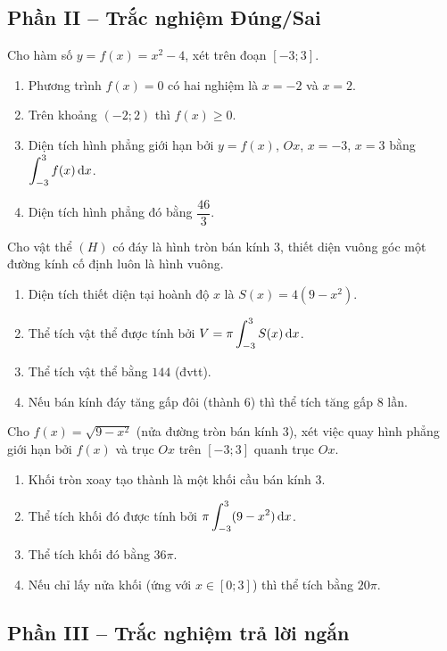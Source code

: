 \newpage
\subsection{Phần II -- Trắc nghiệm Đúng/Sai}

\cauhoi Cho hàm số $y=f(x)=x^2-4$, xét trên đoạn $[-3;3]$.
\begin{enumerate}[label=\textbf{\alph*)}, leftmargin=1cm]
  \item Phương trình $f(x)=0$ có hai nghiệm là $x=-2$ và $x=2$.
  \item Trên khoảng $(-2;2)$ thì $f(x)\ge0$.
  \item Diện tích hình phẳng giới hạn bởi $y=f(x)$, $Ox$, $x=-3$, $x=3$ bằng $\displaystyle\int_{-3}^3 f(x)\,\mathrm{d}x$.
  \item Diện tích hình phẳng đó bằng $\dfrac{46}{3}$.
\end{enumerate}

\cauhoi Cho vật thể $(H)$ có đáy là hình tròn bán kính $3$, thiết diện vuông góc một đường kính cố định luôn là hình vuông.
\begin{enumerate}[label=\textbf{\alph*)}, leftmargin=1cm]
  \item Diện tích thiết diện tại hoành độ $x$ là $S(x)=4(9-x^2)$.
  \item Thể tích vật thể được tính bởi $V=\pi\displaystyle\int_{-3}^3 S(x)\,\mathrm{d}x$.
  \item Thể tích vật thể bằng $144$ (đvtt).
  \item Nếu bán kính đáy tăng gấp đôi (thành $6$) thì thể tích tăng gấp $8$ lần.
\end{enumerate}

\cauhoi Cho $f(x)=\sqrt{9-x^2}$ (nửa đường tròn bán kính $3$), xét việc quay hình phẳng giới hạn bởi $f(x)$ và trục $Ox$ trên $[-3;3]$ quanh trục $Ox$.
\begin{enumerate}[label=\textbf{\alph*)}, leftmargin=1cm]
  \item Khối tròn xoay tạo thành là một khối cầu bán kính $3$.
  \item Thể tích khối đó được tính bởi $\pi\displaystyle\int_{-3}^3(9-x^2)\,\mathrm{d}x$.
  \item Thể tích khối đó bằng $36\pi$.
  \item Nếu chỉ lấy nửa khối (ứng với $x\in[0;3]$) thì thể tích bằng $20\pi$.
\end{enumerate}

\newpage
\subsection{Phần III -- Trắc nghiệm trả lời ngắn}

